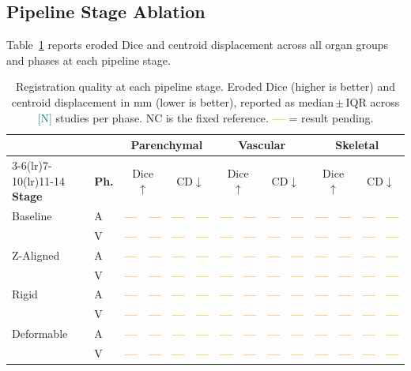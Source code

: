 \documentclass[10pt,twocolumn]{article}
\newcommand{\NUM}[1]{\textcolor{teal}{[#1]}}
\newcommand{\BLANK}{\textcolor{orange}{\textbf{---}}}   %
\begin{document}
\subsection{Pipeline Stage Ablation}
\label{sec:ablation}

Table~\ref{tab:ablation} reports eroded Dice and centroid displacement
across all organ groups and phases at each pipeline stage.

\begin{table}[t]
\centering
\caption{%
  Registration quality at each pipeline stage.
  Eroded Dice (higher is better) and centroid displacement in mm
  (lower is better), reported as median\,$\pm$\,IQR across
  \NUM{N} studies per phase. NC is the fixed reference. \BLANK{} =
  result pending.
}
\label{tab:ablation}
\setlength{\tabcolsep}{5pt}
\begin{tabular}{ll cccc cccc cccc}
\toprule
& & \multicolumn{4}{c}{\textbf{Parenchymal}} &
    \multicolumn{4}{c}{\textbf{Vascular}} &
    \multicolumn{4}{c}{\textbf{Skeletal}} \\
\cmidrule(lr){3-6}\cmidrule(lr){7-10}\cmidrule(lr){11-14}
\textbf{Stage} & \textbf{Ph.} &
  \multicolumn{2}{c}{Dice $\uparrow$} & \multicolumn{2}{c}{CD$\downarrow$} &
  \multicolumn{2}{c}{Dice $\uparrow$} & \multicolumn{2}{c}{CD$\downarrow$} &
  \multicolumn{2}{c}{Dice $\uparrow$} & \multicolumn{2}{c}{CD$\downarrow$} \\
\midrule
Baseline    & A & \BLANK & \BLANK & \BLANK & \BLANK & \BLANK & \BLANK & \BLANK & \BLANK & \BLANK & \BLANK & \BLANK & \BLANK \\
            & V & \BLANK & \BLANK & \BLANK & \BLANK & \BLANK & \BLANK & \BLANK & \BLANK & \BLANK & \BLANK & \BLANK & \BLANK \\
\midrule
Z-Aligned   & A & \BLANK & \BLANK & \BLANK & \BLANK & \BLANK & \BLANK & \BLANK & \BLANK & \BLANK & \BLANK & \BLANK & \BLANK \\
            & V & \BLANK & \BLANK & \BLANK & \BLANK & \BLANK & \BLANK & \BLANK & \BLANK & \BLANK & \BLANK & \BLANK & \BLANK \\
\midrule
Rigid       & A & \BLANK & \BLANK & \BLANK & \BLANK & \BLANK & \BLANK & \BLANK & \BLANK & \BLANK & \BLANK & \BLANK & \BLANK \\
            & V & \BLANK & \BLANK & \BLANK & \BLANK & \BLANK & \BLANK & \BLANK & \BLANK & \BLANK & \BLANK & \BLANK & \BLANK \\
\midrule
Deformable  & A & \BLANK & \BLANK & \BLANK & \BLANK & \BLANK & \BLANK & \BLANK & \BLANK & \BLANK & \BLANK & \BLANK & \BLANK \\
            & V & \BLANK & \BLANK & \BLANK & \BLANK & \BLANK & \BLANK & \BLANK & \BLANK & \BLANK & \BLANK & \BLANK & \BLANK \\
\bottomrule
\end{tabular}
\end{table}
\end{document}
